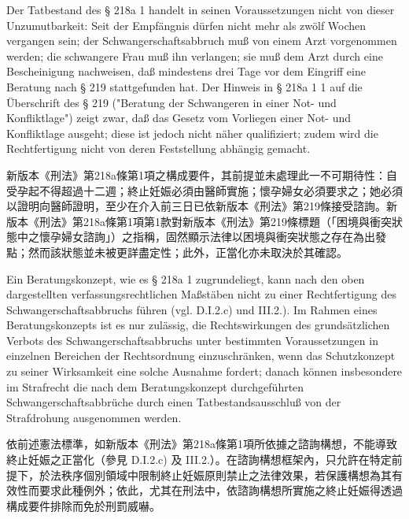 \documentclass[12pt]{article}
\begin{document}
\begin{sourcepara}[title={原文E.162}]
Der Tatbestand des § 218a \abbrAbs{} 1 \abbrStGB{} \abbrNF{} handelt in seinen Voraussetzungen nicht von dieser Unzumutbarkeit: Seit der Empfängnis dürfen nicht mehr als zwölf Wochen vergangen sein; der Schwangerschaftsabbruch muß von einem Arzt vorgenommen werden; die schwangere Frau muß ihn verlangen; sie muß dem Arzt durch eine Bescheinigung nachweisen, daß mindestens drei Tage vor dem Eingriff eine Beratung nach § 219 \abbrStGB{} \abbrNF{} stattgefunden hat. Der Hinweis in § 218a \abbrAbs{} 1 \abbrNr{} 1 \abbrStGB{} \abbrNF{} auf die Überschrift des § 219 \abbrStGB{} \abbrNF{} ("Beratung der Schwangeren in einer Not- und Konfliktlage") zeigt zwar, daß das Gesetz vom Vorliegen einer Not- und Konfliktlage ausgeht; diese ist jedoch nicht näher qualifiziert; zudem wird die Rechtfertigung nicht von deren Feststellung abhängig gemacht.
\end{sourcepara}
\begin{transpara}
新版本《刑法》第218a條第1項之構成要件，其前提並未處理此一不可期待性：自受孕起不得超過十二週；終止妊娠必須由醫師實施；懷孕婦女必須要求之；她必須以證明向醫師證明，至少在介入前三日已依新版本《刑法》第219條接受諮詢。新版本《刑法》第218a條第1項第1款對新版本《刑法》第219條標題（「困境與衝突狀態中之懷孕婦女諮詢」）之指稱，固然顯示法律以困境與衝突狀態之存在為出發點；然而該狀態並未被更詳盡定性；此外，正當化亦未取決於其確認。
\end{transpara}

\begin{sourcepara}[title={原文E.163}]
Ein Beratungskonzept, wie es § 218a \abbrAbs{} 1 \abbrStGB{} \abbrNF{} zugrundeliegt, kann nach den oben dargestellten verfassungsrechtlichen Maßstäben nicht zu einer Rechtfertigung des Schwangerschaftsabbruchs führen (vgl. D.I.2.c) und III.2.). Im Rahmen eines Beratungskonzepts ist es nur zulässig, die Rechtswirkungen des grundsätzlichen Verbots des Schwangerschaftsabbruchs unter bestimmten Voraussetzungen in einzelnen Bereichen der Rechtsordnung einzuschränken, wenn das Schutzkonzept zu seiner Wirksamkeit eine solche Ausnahme fordert; danach können insbesondere im Strafrecht die nach dem Beratungskonzept durchgeführten Schwangerschaftsabbrüche durch einen Tatbestandsausschluß von der Strafdrohung ausgenommen werden.
\end{sourcepara}
\begin{transpara}
依前述憲法標準，如新版本《刑法》第218a條第1項所依據之諮詢構想，不能導致終止妊娠之正當化（參見 D.I.2.c) 及 III.2.）。在諮詢構想框架內，只允許在特定前提下，於法秩序個別領域中限制終止妊娠原則禁止之法律效果，若保護構想為其有效性而要求此種例外；依此，尤其在刑法中，依諮詢構想所實施之終止妊娠得透過構成要件排除而免於刑罰威嚇。
\end{transpara}
\end{document}
